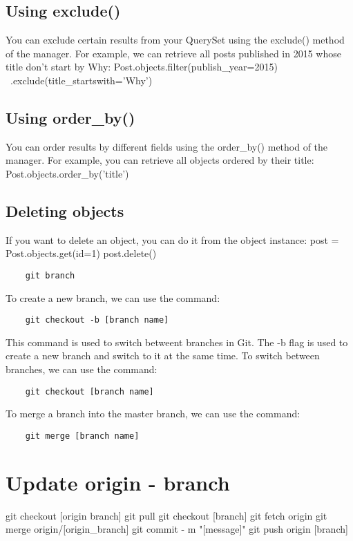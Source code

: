 \documentclass[12pt]{article}
\begin{document}
\subsection{Using exclude()}
You can exclude certain results from your QuerySet using the exclude() method
of the manager. For example, we can retrieve all posts published in 2015 whose
title don't start by Why:
Post.objects.filter(publish_year=2015) \
			.exclude(title_startswith='Why')

\subsection{Using order_by()}
You can order results by different fields using the order_by() method of the
manager. For example, you can retrieve all objects ordered by their title:
Post.objects.order_by('title')

\subsection{Deleting objects}
If you want to delete an object, you can do it from the object instance:
post = Post.objects.get(id=1)
post.delete()

\begin{verbatim}
    git branch
\end{verbatim}
To create a new branch, we can use the command:
\begin{verbatim}
    git checkout -b [branch name]
\end{verbatim}
This command is used to switch betweent branches in Git.
The -b flag is used to create a new branch and switch to it at the same time.
To switch between branches, we can use the command:
\begin{verbatim}
    git checkout [branch name]
\end{verbatim}
To merge a branch into the master branch, we can use the command:
\begin{verbatim}
    git merge [branch name]
\end{verbatim}

\section{Update origin - branch}
git checkout [origin branch]
git pull
git checkout [branch]
git fetch origin
git merge origin/[origin_branch]
git commit - m "[message]"
git push origin [branch]
\end{document}
